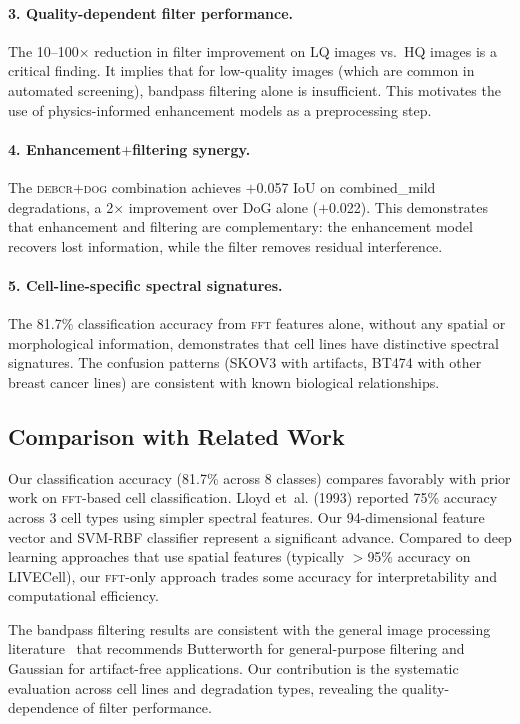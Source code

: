 \documentclass[11pt,a4paper]{article}
\newcommand{\etal}{et~al.\xspace}
\newcommand{\fft}{\textsc{fft}\xspace}
\newcommand{\debcr}{\textsc{debcr}\xspace}
\newcommand{\dog}{\textsc{dog}\xspace}
\begin{document}
\paragraph{3. Quality-dependent filter performance.}
The 10--100$\times$ reduction in filter improvement on LQ images vs.\ HQ
images is a critical finding. It implies that for low-quality images
(which are common in automated screening), bandpass filtering alone is
insufficient. This motivates the use of physics-informed enhancement
models as a preprocessing step.

\paragraph{4. Enhancement$+$filtering synergy.}
The \debcr$+$\dog combination achieves $+$0.057 IoU on combined\_mild
degradations, a 2$\times$ improvement over DoG alone ($+$0.022). This
demonstrates that enhancement and filtering are complementary: the
enhancement model recovers lost information, while the filter removes
residual interference.

\paragraph{5. Cell-line-specific spectral signatures.}
The 81.7\% classification accuracy from \fft features alone, without any
spatial or morphological information, demonstrates that cell lines have
distinctive spectral signatures. The confusion patterns (SKOV3 with
artifacts, BT474 with other breast cancer lines) are consistent with
known biological relationships.

\subsection{Comparison with Related Work}

Our classification accuracy (81.7\% across 8 classes) compares favorably
with prior work on \fft-based cell classification. Lloyd \etal
(1993) reported 75\% accuracy across 3 cell types using simpler spectral
features. Our 94-dimensional feature vector and SVM-RBF classifier
represent a significant advance. Compared to deep learning approaches
that use spatial features (typically $>$95\% accuracy on LIVECell), our
\fft-only approach trades some accuracy for interpretability and
computational efficiency.

The bandpass filtering results are consistent with the general image
processing literature~\cite{gonzalez2018digital} that recommends
Butterworth for general-purpose filtering and Gaussian for artifact-free
applications. Our contribution is the systematic evaluation across cell
lines and degradation types, revealing the quality-dependence of filter
performance.
\end{document}
